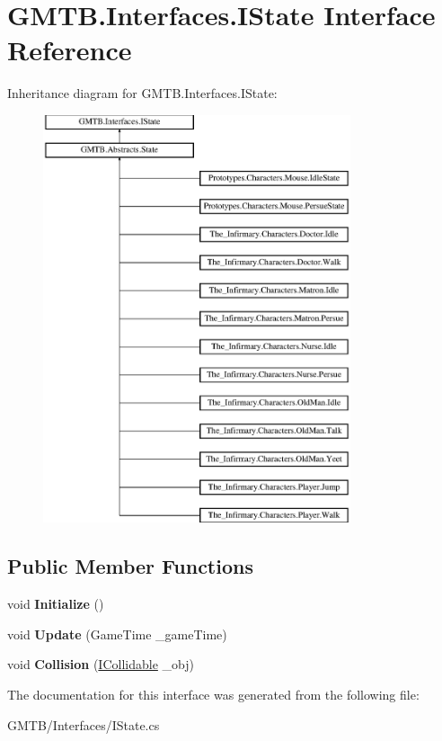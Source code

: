 \hypertarget{interface_g_m_t_b_1_1_interfaces_1_1_i_state}{}\section{G\+M\+T\+B.\+Interfaces.\+I\+State Interface Reference}
\label{interface_g_m_t_b_1_1_interfaces_1_1_i_state}
Inheritance diagram for G\+M\+T\+B.\+Interfaces.\+I\+State\+:\begin{figure}[H]
\begin{center}
\leavevmode
\includegraphics[height=12.000000cm]{interface_g_m_t_b_1_1_interfaces_1_1_i_state}
\end{center}
\end{figure}
\subsection*{Public Member Functions}
\begin{DoxyCompactItemize}
\item 
\mbox{\label{interface_g_m_t_b_1_1_interfaces_1_1_i_state_a1b1a326d0a9a16c6c2266c3a722ec44b}} 
void {\bfseries Initialize} ()
\item 
\mbox{\label{interface_g_m_t_b_1_1_interfaces_1_1_i_state_a2f8110d4a5d6d79b85ab53778064d13a}} 
void {\bfseries Update} (Game\+Time \+\_\+game\+Time)
\item 
\mbox{\label{interface_g_m_t_b_1_1_interfaces_1_1_i_state_aa848b64f42f27f1c9f603d9db6c818f3}} 
void {\bfseries Collision} (\mbox{\hyperlink{interface_g_m_t_b_1_1_collision_system_1_1_i_collidable}{I\+Collidable}} \+\_\+obj)
\end{DoxyCompactItemize}


The documentation for this interface was generated from the following file\+:\begin{DoxyCompactItemize}
\item 
G\+M\+T\+B/\+Interfaces/I\+State.\+cs\end{DoxyCompactItemize}
